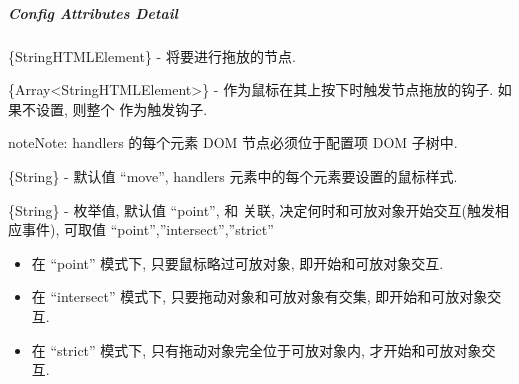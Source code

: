 \documentclass[letterpaper,10pt,english]{sphinxmanual}
\begin{document}
\subparagraph{Config Attributes Detail}
\label{api/component/dd/draggable:config-attributes-detail}

\begin{fulllineitems}
\label{api/component/dd/draggable:Draggable.node}
\{String\textbar{}HTMLElement\} - 将要进行拖放的节点.

\end{fulllineitems}



\begin{fulllineitems}
\label{api/component/dd/draggable:Draggable.handlers}
\{Array\textless{}String\textbar{}HTMLElement\textgreater{}\} - 作为鼠标在其上按下时触发节点拖放的钩子. 如果不设置, 则整个  作为触发钩子.

\begin{notice}{note}{Note:}
handlers 的每个元素 DOM 节点必须位于配置项  DOM 子树中.
\end{notice}

\end{fulllineitems}



\begin{fulllineitems}
\label{api/component/dd/draggable:Draggable.cursor}
\{String\} - 默认值 ``move'', handlers 元素中的每个元素要设置的鼠标样式.

\end{fulllineitems}



\begin{fulllineitems}
\label{api/component/dd/draggable:Draggable.mode}
\{String\} - 枚举值, 默认值 ``point'', 和  关联, 决定何时和可放对象开始交互(触发相应事件), 可取值 ``point'',''intersect'',''strict''
\begin{itemize}
\item {}
在 ``point'' 模式下, 只要鼠标略过可放对象, 即开始和可放对象交互.

\item {}
在 ``intersect'' 模式下, 只要拖动对象和可放对象有交集, 即开始和可放对象交互.

\item {}
在 ``strict'' 模式下, 只有拖动对象完全位于可放对象内, 才开始和可放对象交互.

\end{itemize}

\end{fulllineitems}
\end{document}
